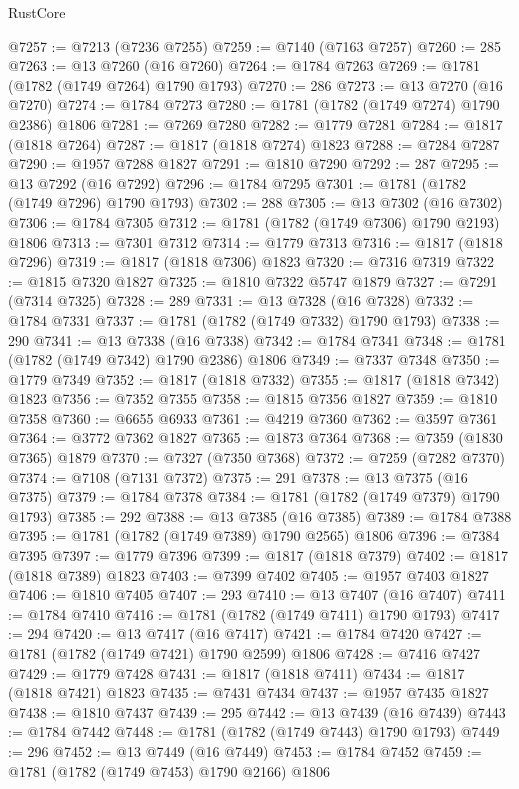 \begin{lexlean}{RustCore}
\begin{coremodule}
@7257 := @7213 (@7236 @7255)
@7259 := @7140 (@7163 @7257)
@7260 := 285
@7263 := @13 @7260 (@16 @7260)
@7264 := @1784 @7263
@7269 := @1781 (@1782 (@1749 @7264) @1790 @1793)
@7270 := 286
@7273 := @13 @7270 (@16 @7270)
@7274 := @1784 @7273
@7280 := @1781 (@1782 (@1749 @7274) @1790 @2386) @1806
@7281 := @7269 @7280
@7282 := @1779 @7281
@7284 := @1817 (@1818 @7264)
@7287 := @1817 (@1818 @7274) @1823
@7288 := @7284 @7287
@7290 := @1957 @7288 @1827
@7291 := @1810 @7290
@7292 := 287
@7295 := @13 @7292 (@16 @7292)
@7296 := @1784 @7295
@7301 := @1781 (@1782 (@1749 @7296) @1790 @1793)
@7302 := 288
@7305 := @13 @7302 (@16 @7302)
@7306 := @1784 @7305
@7312 := @1781 (@1782 (@1749 @7306) @1790 @2193) @1806
@7313 := @7301 @7312
@7314 := @1779 @7313
@7316 := @1817 (@1818 @7296)
@7319 := @1817 (@1818 @7306) @1823
@7320 := @7316 @7319
@7322 := @1815 @7320 @1827
@7325 := @1810 @7322 @5747 @1879
@7327 := @7291 (@7314 @7325)
@7328 := 289
@7331 := @13 @7328 (@16 @7328)
@7332 := @1784 @7331
@7337 := @1781 (@1782 (@1749 @7332) @1790 @1793)
@7338 := 290
@7341 := @13 @7338 (@16 @7338)
@7342 := @1784 @7341
@7348 := @1781 (@1782 (@1749 @7342) @1790 @2386) @1806
@7349 := @7337 @7348
@7350 := @1779 @7349
@7352 := @1817 (@1818 @7332)
@7355 := @1817 (@1818 @7342) @1823
@7356 := @7352 @7355
@7358 := @1815 @7356 @1827
@7359 := @1810 @7358
@7360 := @6655 @6933
@7361 := @4219 @7360
@7362 := @3597 @7361
@7364 := @3772 @7362 @1827
@7365 := @1873 @7364
@7368 := @7359 (@1830 @7365) @1879
@7370 := @7327 (@7350 @7368)
@7372 := @7259 (@7282 @7370)
@7374 := @7108 (@7131 @7372)
@7375 := 291
@7378 := @13 @7375 (@16 @7375)
@7379 := @1784 @7378
@7384 := @1781 (@1782 (@1749 @7379) @1790 @1793)
@7385 := 292
@7388 := @13 @7385 (@16 @7385)
@7389 := @1784 @7388
@7395 := @1781 (@1782 (@1749 @7389) @1790 @2565) @1806
@7396 := @7384 @7395
@7397 := @1779 @7396
@7399 := @1817 (@1818 @7379)
@7402 := @1817 (@1818 @7389) @1823
@7403 := @7399 @7402
@7405 := @1957 @7403 @1827
@7406 := @1810 @7405
@7407 := 293
@7410 := @13 @7407 (@16 @7407)
@7411 := @1784 @7410
@7416 := @1781 (@1782 (@1749 @7411) @1790 @1793)
@7417 := 294
@7420 := @13 @7417 (@16 @7417)
@7421 := @1784 @7420
@7427 := @1781 (@1782 (@1749 @7421) @1790 @2599) @1806
@7428 := @7416 @7427
@7429 := @1779 @7428
@7431 := @1817 (@1818 @7411)
@7434 := @1817 (@1818 @7421) @1823
@7435 := @7431 @7434
@7437 := @1957 @7435 @1827
@7438 := @1810 @7437
@7439 := 295
@7442 := @13 @7439 (@16 @7439)
@7443 := @1784 @7442
@7448 := @1781 (@1782 (@1749 @7443) @1790 @1793)
@7449 := 296
@7452 := @13 @7449 (@16 @7449)
@7453 := @1784 @7452
@7459 := @1781 (@1782 (@1749 @7453) @1790 @2166) @1806

\end{coremodule}
\end{lexlean}
